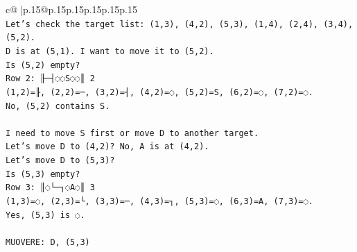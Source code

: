 \documentclass{article}
\begin{document}
{\begin{supertabular}{c@{$\;$}|p{.15\linewidth}@{}p{.15\linewidth}p{.15\linewidth}p{.15\linewidth}p{.15\linewidth}p{.15\linewidth}}
{{{\\ 
\texttt{Let's check the target list: (1,3), (4,2), (5,3), (1,4), (2,4), (3,4), (5,2).} \\
\texttt{D is at (5,1). I want to move it to (5,2).} \\
\texttt{Is (5,2) empty?} \\
\texttt{Row 2: ╟─┤◌◌S◌◌║ 2} \\
\texttt{(1,2)=╟, (2,2)=─, (3,2)=┤, (4,2)=◌, (5,2)=S, (6,2)=◌, (7,2)=◌.} \\
\texttt{No, (5,2) contains S.} \\
\\ 
\texttt{I need to move S first or move D to another target.} \\
\texttt{Let's move D to (4,2)? No, A is at (4,2).} \\
\texttt{Let's move D to (5,3)?} \\
\texttt{Is (5,3) empty?} \\
\texttt{Row 3: ║◌└─┐◌A◌║ 3} \\
\texttt{(1,3)=◌, (2,3)=└, (3,3)=─, (4,3)=┐, (5,3)=◌, (6,3)=A, (7,3)=◌.} \\
\texttt{Yes, (5,3) is ◌.} \\
\\ 
\texttt{MUOVERE: D, (5,3)} \\
            }
        }
    }
     \\ \\


\end{supertabular}}
\end{document}
